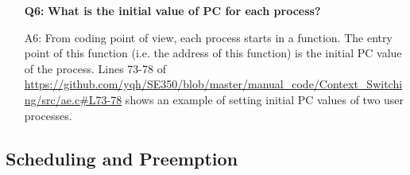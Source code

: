 \begin{itemize}
\item[{\bf Q6:}] {\bf What is the initial value of PC for each process?}
\item[A6:] From coding point of view, each process starts in a function. The entry point of this function (i.e. the address of this function) is the initial PC value of the process. Lines 73-78 of \url{https://github.com/yqh/SE350/blob/master/manual_code/Context_Switching/src/ae.c#L73-78} shows an example of setting initial PC values of two user processes. 
  
\end{itemize}

\subsection{Scheduling and Preemption}
\label{sec_faq_sched}
